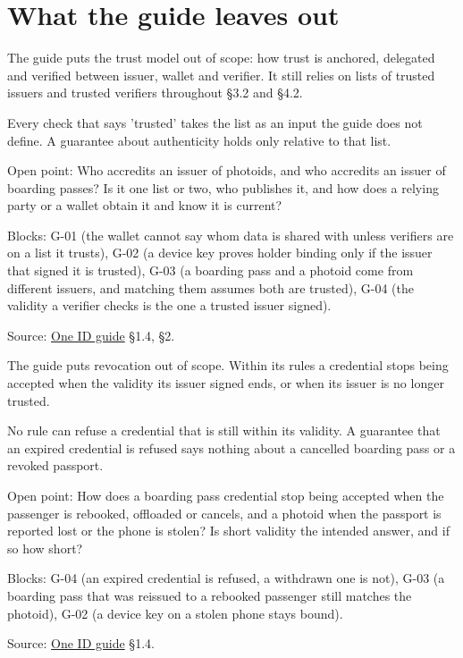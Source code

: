 
\section{What the guide leaves out}

\begin{definition}
  \label{def:c01}
  \notready
  The guide puts the trust model out of scope: how trust is anchored,
  delegated and verified between issuer, wallet and verifier. It still relies
  on lists of trusted issuers and trusted verifiers throughout §3.2 and §4.2.

  Every check that says 'trusted' takes the list as an input the guide does
  not define. A guarantee about authenticity holds only relative to that
  list.

  Open point: Who accredits an issuer of photoids, and who accredits an
  issuer of boarding passes? Is it one list or two, who publishes it, and how
  does a relying party or a wallet obtain it and know it is current?

  Blocks: G-01 (the wallet cannot say whom data is shared with unless
  verifiers are on a list it trusts), G-02 (a device key proves holder
  binding only if the issuer that signed it is trusted), G-03 (a boarding
  pass and a photoid come from different issuers, and matching them assumes
  both are trusted), G-04 (the validity a verifier checks is the one a
  trusted issuer signed).

  Source:
  \href{https://standards.atlassian.net/wiki/spaces/OneID/pages/2947416082/Technical+Implementation+Guide}{One
  ID guide} §1.4, §2.
\end{definition}

\begin{definition}[Revocation (C-02)]
  \label{def:c02}
  \notready
  The guide puts revocation out of scope. Within its rules a credential stops
  being accepted when the validity its issuer signed ends, or when its issuer
  is no longer trusted.

  No rule can refuse a credential that is still within its validity. A
  guarantee that an expired credential is refused says nothing about a
  cancelled boarding pass or a revoked passport.

  Open point: How does a boarding pass credential stop being accepted when
  the passenger is rebooked, offloaded or cancels, and a photoid when the
  passport is reported lost or the phone is stolen? Is short validity the
  intended answer, and if so how short?

  Blocks: G-04 (an expired credential is refused, a withdrawn one is not),
  G-03 (a boarding pass that was reissued to a rebooked passenger still
  matches the photoid), G-02 (a device key on a stolen phone stays bound).

  Source:
  \href{https://standards.atlassian.net/wiki/spaces/OneID/pages/2947416082/Technical+Implementation+Guide}{One
  ID guide} §1.4.
\end{definition}

